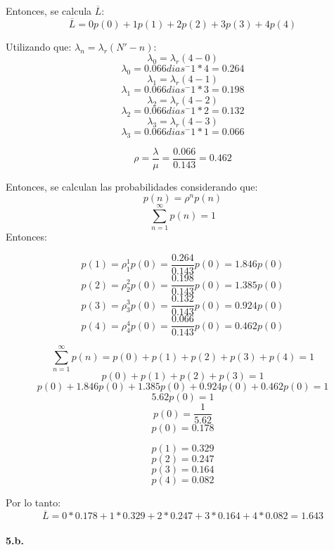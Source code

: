\documentclass{article}
\begin{document}
  Entonces, se calcula $\overline{L}$:
  $$\overline{L} = 0 p(0) + 1 p(1) + 2 p(2) + 3 p(3) + 4 p(4) $$

  Utilizando que: $\lambda_n = \lambda_r (N' - n)$:
    $$\lambda_0 = \lambda_r (4 - 0)$$
    $$\lambda_0 = 0.066 dias^-1 * 4 = 0.264 $$
    $$\lambda_1 = \lambda_r (4 - 1)$$
    $$\lambda_1 = 0.066 dias^-1 * 3 = 0.198 $$
    $$\lambda_2 = \lambda_r (4 - 2)$$
    $$\lambda_2 = 0.066 dias^-1 * 2 = 0.132 $$
    $$\lambda_3 = \lambda_r (4 - 3)$$
    $$\lambda_3 = 0.066 dias^-1 * 1 = 0.066 $$
    
    $$\rho = \frac{\lambda}{\mu} = \frac{0.066}{0.143}=0.462 $$ 

  Entonces, se calculan las probabilidades considerando que:
      $$ p(n) = \rho^{n} p(n)$$
    $$ \sum _{n=1}^{\infty} {p(n)} = 1$$
  Entonces:

    $$ p(1) = \rho_1^{1} p(0) = \frac{0.264}{0.143} p(0) = 1.846 p(0)$$
    $$ p(2) = \rho_2^{2} p(0) = \frac{0.198}{0.143} p(0) = 1.385 p(0)$$
    $$ p(3) = \rho_3^{3} p(0) = \frac{0.132}{0.143} p(0) = 0.924 p(0)$$
    $$ p(4) = \rho_4^{4} p(0) = \frac{0.066}{0.143} p(0) = 0.462 p(0)$$

    $$ \sum _{n=1}^{\infty} {p(n)} = p(0) + p(1) + p(2) + p(3) + p(4) = 1$$
    $$p(0) + p(1) + p(2) + p(3) = 1$$
    $$p(0) + 1.846 p(0) + 1.385 p(0) + 0.924 p(0) + 0.462 p(0) = 1$$
    $$5.62 p(0) = 1$$
    $$p(0) = \frac{1}{5.62}$$
    $$p(0) = 0.178$$

  $$p(1) = 0.329$$
  $$p(2) = 0.247$$
  $$p(3) = 0.164$$
  $$p(4) = 0.082$$

Por lo tanto:
$$\overline{L} = 0 * 0.178 + 1 * 0.329 + 2 * 0.247 + 3 * 0.164 + 4 * 0.082 = 1.643 $$
  
\paragraph{5.b.}
    
    
\end{document}
